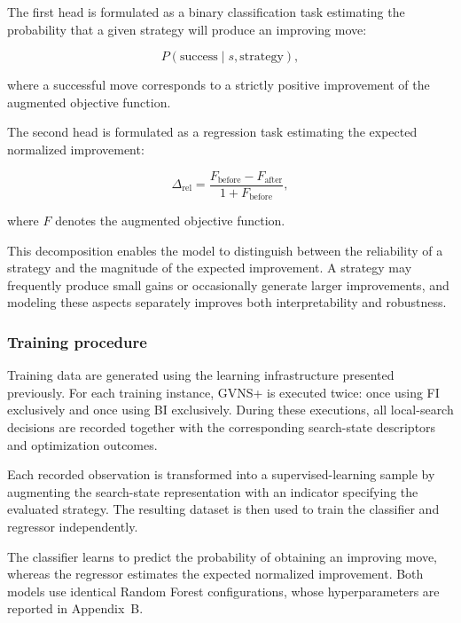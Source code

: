 The first head is formulated as a binary classification task estimating the probability that a given strategy will produce an improving move:

\begin{equation}
P(\text{success}\mid s,\text{strategy}),
\label{eq:rf_prob}
\end{equation}

where a successful move corresponds to a strictly positive improvement of the augmented objective function.

The second head is formulated as a regression task estimating the expected normalized improvement:

\begin{equation}
\Delta_{\text{rel}}
=
\frac{F_{\text{before}}-F_{\text{after}}}
{1+F_{\text{before}}},
\label{eq:rf_gain}
\end{equation}

where $F$ denotes the augmented objective function.

This decomposition enables the model to distinguish between the reliability of a strategy and the magnitude of the expected improvement. A strategy may frequently produce small gains or occasionally generate larger improvements, and modeling these aspects separately improves both interpretability and robustness.

\subsubsection{Training procedure}
Training data are generated using the learning infrastructure presented previously. For each training instance, GVNS+ is executed twice: once using FI exclusively and once using BI exclusively. During these executions, all local-search decisions are recorded together with the corresponding search-state descriptors and optimization outcomes.

Each recorded observation is transformed into a supervised-learning sample by augmenting the search-state representation with an indicator specifying the evaluated strategy. The resulting dataset is then used to train the classifier and regressor independently.

The classifier learns to predict the probability of obtaining an improving move, whereas the regressor estimates the expected normalized improvement. Both models use identical Random Forest configurations, whose hyperparameters are reported in Appendix~B.

